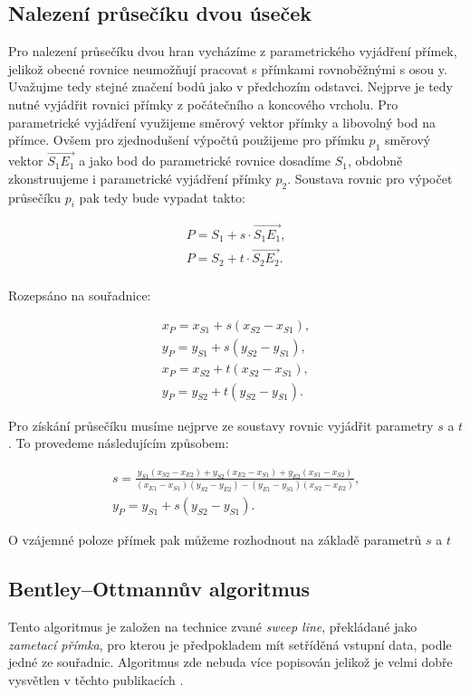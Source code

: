 \subsection{Nalezení průsečíku dvou úseček}
	Pro nalezení průsečíku dvou hran vycházíme z parametrického vyjádření přímek, jelikož obecné rovnice neumožňují pracovat s přímkami rovnoběžnými s osou y. Uvažujme tedy stejné značení bodů jako v předchozím odstavci. Nejprve je tedy nutné vyjádřit rovnici přímky z počátečního a koncového vrcholu. Pro parametrické vyjádření využijeme směrový vektor přímky a libovolný bod na přímce. Ovšem pro zjednodušení výpočtů použijeme pro přímku $p_1$ směrový vektor $\overrightarrow{S_1E_1}$ a jako bod do parametrické rovnice dosadíme $S_1$, obdobně zkonstruujeme i parametrické vyjádření přímky $p_2$. Soustava rovnic pro výpočet průsečíku $p_i$ pak tedy bude vypadat takto:
	
\begin{align*} 
P = S_1 + s \cdot \overrightarrow{S_1E_1}, \\
P = S_2 + t \cdot \overrightarrow{S_2E_2}. \\
\end{align*}

Rozepsáno na souřadnice:

\begin{align*} 
x_P = x_{S1} + s(x_{S2} - x_{S1}), \\
y_P = y_{S1} + s(y_{S2} - y_{S1}), \\
x_P = x_{S2} + t(x_{S2} - x_{S1}), \\
y_P = y_{S2} + t(y_{S2} - y_{S1}).
\end{align*}

Pro získání průsečíku musíme nejprve ze soustavy rovnic vyjádřit parametry $s$ a $t$. To provedeme následujícím způsobem:

\begin{align*} 
s = \frac{y_{S1}(x_{S2} - x_{E2}) + y_{S2}(x_{E2} - x_{S1}) + y_{E2}(x_{S1} - x_{S2})}{(x_{E1} - x_{S1}) (y_{S2} - y_{E2})   -   (y_{E1} - y_{S1}) (x_{S2} - x_{E2})}, \\
y_P = y_{S1} + s(y_{S2} - y_{S1}).
\end{align*}


O vzájemné poloze přímek pak můžeme rozhodnout na základě parametrů $s$ a $t$


\subsection{Bentley–Ottmannův algoritmus}
Tento algoritmus je založen na technice zvané \textit{sweep line}, překládané jako \textit{zametací přímka}, pro kterou je předpokladem mít setříděná vstupní data, podle jedné ze souřadnic. Algoritmus zde nebuda více popisován jelikož je velmi dobře vysvětlen v těchto publikacích \cite{bentley1979algorithms} \cite{bayer2008algoritmy}.







